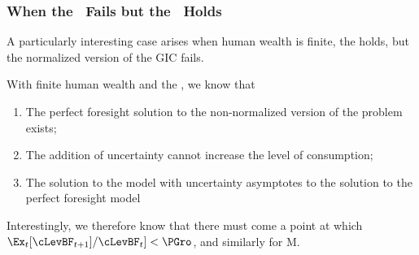 \subsubsection{When the \GICNrm~Fails but the \GICAbs~Holds}\label{sec:WhenTheGICNrmFailsButGICAbsHolds}

A particularly interesting case arises when human wealth is finite, the {\RIC} holds, but the normalized version of the GIC fails.

With finite human wealth and the {\RIC}, we know that
\begin{enumerate}
\item The perfect foresight solution to the non-normalized version of the problem exists;
\item The addition of uncertainty cannot increase the level of consumption;
  \item The solution to the model with uncertainty asymptotes to the solution to the perfect foresight model
  \end{enumerate}

  Interestingly, we therefore know that there must come a point at which $\Ex_{t}[\cLevBF_{t+1}]/\cLevBF_{t}] < \PGro$, and similarly for M.  
